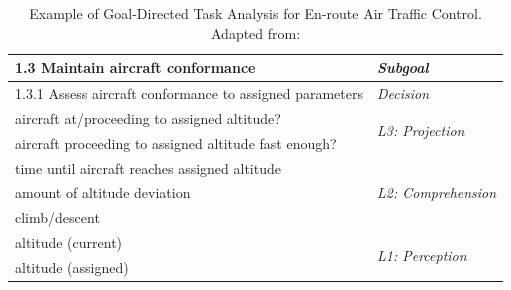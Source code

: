 \begin{table}[]
	\caption{Example of Goal-Directed Task Analysis for En-route Air Traffic Control. Adapted from: \parencite{endsley_direct_nodate}}
	\label{tab:sagoalorientedtaskanalysisresultexample}
	\begin{tabularx}{\linewidth}{X|l}
		\hline
		1.3 Maintain aircraft conformance                        & \textit{Subgoal}                            \\ \hline
		\hspace{.25cm}1.3.1 Assess aircraft conformance to assigned parameters & \textit{Decision}                           \\ \hline
		\hspace{.25cm}\hspace{.25cm}aircraft at/proceeding to assigned altitude?             & \multirow{2}{*}{\textit{L3: Projection}}    \\
		\hspace{.25cm}\hspace{.25cm}aircraft proceeding to assigned altitude fast enough?    &                                             \\ \hline
		\hspace{.25cm}\hspace{.25cm}\hspace{.25cm}time until aircraft reaches assigned altitude            & \multirow{3}{*}{\textit{L2: Comprehension}} \\
		\hspace{.25cm}\hspace{.25cm}\hspace{.25cm}amount of altitude deviation                             &                                             \\
		\hspace{.25cm}\hspace{.25cm}\hspace{.25cm}climb/descent                                            &                                             \\ \hline
		\hspace{.25cm}\hspace{.25cm}\hspace{.25cm}\hspace{.25cm}altitude (current)                                       & \multirow{3}{*}{\textit{L1: Perception}}    \\
		\hspace{.25cm}\hspace{.25cm}\hspace{.25cm}\hspace{.25cm}altitude (assigned)                                      &                                             \\

\end{tabularx}
\end{table}
